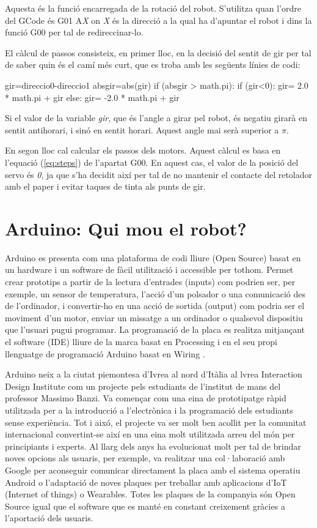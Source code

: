 Aquesta és la funció encarregada de la rotació del robot. S’utilitza quan l’ordre del GCode és G01 A\emph{X} on \emph{X} és la direcció a la qual ha d’apuntar el robot i dins la funció G00 per tal de redireccinar-lo. 

El càlcul de passos consisteix, en primer lloc, en la decisió del sentit de gir per tal de saber quin és el camí més curt, que es troba amb les següents línies de codi:
\begin{python}
	gir=direccio0-direccio1 
	absgir=abs(gir) 
	if (absgir > math.pi):
		if (gir<0):
			gir= 2.0 * math.pi + gir 
		else:
			gir= -2.0 * math.pi + gir
\end{python}
Si el valor de la variable \emph{gir}, que és l’angle a girar pel robot, és negatiu girarà en sentit antihorari, i sinó en sentit horari. Aquest angle mai serà superior a $\pi$. 

En segon lloc cal calcular els passos dels motors. Aquest càlcul es basa en l’equació (\ref{eq:steps}) de l’apartat G00. En aquest cas, el valor de la posició del servo és \emph{0}, ja que s’ha decidit així per tal de no mantenir el contacte del retolador amb el paper i evitar taques de tinta als punts de gir. 





\section{Arduino: Qui mou el robot?}

Arduino es presenta com una plataforma de codi lliure (Open Source) basat en un hardware i un software de fàcil utilització i accessible per tothom.  Permet crear prototips a partir de la lectura d’entrades (inputs) com podrien ser, per exemple, un sensor de temperatura, l’acció d’un polsador o una comunicació des de l’ordinador, i convertir-ho en una acció de sortida (output) com podria ser el moviment d’un motor, enviar un missatge a un ordinador o qualsevol dispositiu que l’usuari pugui programar. La programació de la placa es realitza mitjançant el software (IDE) lliure de la marca basat en Processing i en el seu propi llenguatge de programació Arduino basat en Wiring \cite{arduinoBib} \cite{massimobanzi2011}. 

Arduino neix a la ciutat piemontesa d’Ivrea al nord d’Itàlia al lvrea Interaction Design Institute com un projecte pels estudiants de l’institut de mans del professor Massimo Banzi. Va començar com una eina de prototipatge ràpid utilitzada per a la introducció a l’electrònica i la programació dels estudiants sense experiència. Tot i aixó, el projecte va ser molt ben acollit per la comunitat internacional convertint-se així en una eina molt utilitzada arreu del món per principiants i experts. Al llarg dels anys ha evolucionat molt per tal de brindar noves opcions als usuaris, per exemple, va realitzar una col·laboració amb Google per aconseguir comunicar directament la placa amb el sistema operatiu Android o l’adaptació de noves plaques per treballar amb aplicacions d’IoT (Internet of things) o Wearables. Totes les plaques de la companyia són Open Source igual que el software que es manté en constant creixement gràcies a l’aportació dels usuaris. 

